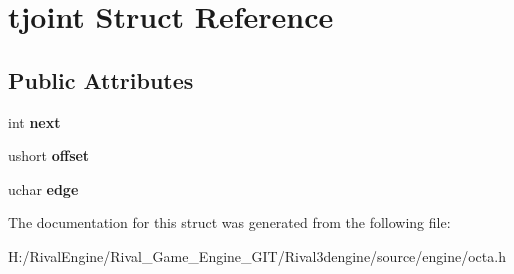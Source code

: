 \hypertarget{structtjoint}{}\section{tjoint Struct Reference}
\label{structtjoint}
\subsection*{Public Attributes}
\begin{DoxyCompactItemize}
\item 
\mbox{\label{structtjoint_ac264026d16fce296ea417a96d5c2a193}} 
int {\bfseries next}
\item 
\mbox{\label{structtjoint_ab4fba2153b4e2f5de6ebfb9037b1105a}} 
ushort {\bfseries offset}
\item 
\mbox{\label{structtjoint_ae8ffd3987b8689d7a083f528cec58748}} 
uchar {\bfseries edge}
\end{DoxyCompactItemize}


The documentation for this struct was generated from the following file\+:\begin{DoxyCompactItemize}
\item 
H\+:/\+Rival\+Engine/\+Rival\+\_\+\+Game\+\_\+\+Engine\+\_\+\+G\+I\+T/\+Rival3dengine/source/engine/octa.\+h\end{DoxyCompactItemize}
